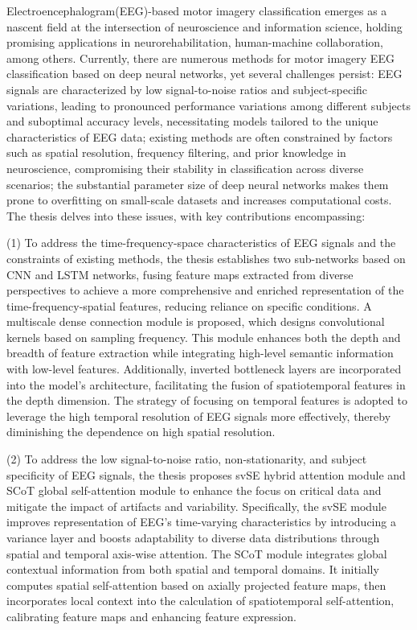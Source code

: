 
Electroencephalogram(EEG)-based motor imagery classification emerges as a nascent field at the intersection of neuroscience and information science, holding promising applications in neurorehabilitation, human-machine collaboration, among others.  Currently, there are numerous methods for motor imagery EEG classification based on deep neural networks, yet several challenges persist: EEG signals are characterized by low signal-to-noise ratios and subject-specific variations, leading to pronounced performance variations among different subjects and suboptimal accuracy levels, necessitating models tailored to the unique characteristics of EEG data; existing methods are often constrained by factors such as spatial resolution, frequency filtering, and prior knowledge in neuroscience, compromising their stability in classification across diverse scenarios; the substantial parameter size of deep neural networks makes them prone to overfitting on small-scale datasets and increases computational costs. The thesis delves into these issues, with key contributions encompassing:

(1) To address the time-frequency-space characteristics of EEG signals and the constraints of existing methods, the thesis establishes two sub-networks based on CNN and LSTM networks, fusing feature maps extracted from diverse perspectives to achieve a more comprehensive and enriched representation of the time-frequency-spatial features, reducing reliance on specific conditions. A multiscale dense connection module is proposed, which designs convolutional kernels based on sampling frequency. This module enhances both the depth and breadth of feature extraction while integrating high-level semantic information with low-level features. Additionally, inverted bottleneck layers are incorporated into the model's architecture, facilitating the fusion of spatiotemporal features in the depth dimension. The strategy of focusing on temporal features is adopted to leverage the high temporal resolution of EEG signals more effectively, thereby diminishing the dependence on high spatial resolution.

(2) To address the low signal-to-noise ratio, non-stationarity, and subject specificity of EEG signals, the thesis proposes svSE hybrid attention module and SCoT global self-attention module to enhance the focus on critical data and mitigate the impact of artifacts and variability. Specifically, the svSE module improves representation of EEG's time-varying characteristics by introducing a variance layer and boosts adaptability to diverse data distributions through spatial and temporal axis-wise attention. The SCoT module integrates global contextual information from both spatial and temporal domains. It initially computes spatial self-attention based on axially projected feature maps, then incorporates local context into the calculation of spatiotemporal self-attention, calibrating feature maps and enhancing feature expression.

